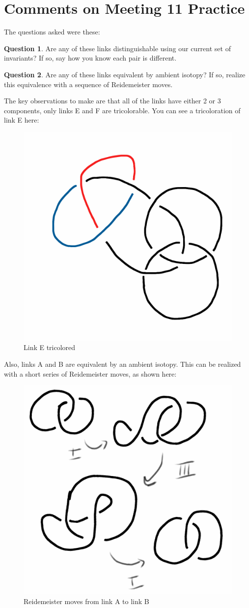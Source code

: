 \documentclass[12pt,letterpaper]{article}
\theoremstyle{definition}
\newtheorem{question}{Question}
\begin{document}
\setlength{\parskip}{1ex plus 0.5ex minus 0.2ex}
\setlength{\parindent}{0pt}

\pagestyle{fancy}
\cfoot{}


\section*{Comments on Meeting 11 Practice}


The questions asked were these:

\begin{question} 
Are any of these links distinguishable using our current set of invariants?
If so, say how you know each pair is different.
\end{question}


\begin{question} 
Are any of these links equivalent by ambient isotopy? 
If so, realize this equivalence with a sequence of Reidemeister moves.
\end{question}

The key observations to make are that all of the links have either 2 or 3 components, only links E and F are tricolorable. You can see a tricoloration of link E here:


\begin{figure}[h]
    \centering
        \includegraphics[width=.3\textwidth]{knotpics/borromean-trefoil-tricolor.png}
        \caption{Link E tricolored}
\end{figure}

Also, links A and B are equivalent by an ambient isotopy. This can be realized with a short series of Reidemeister moves, as shown here:

\begin{figure}[h]
    \centering
        \includegraphics[width=.4\textwidth]{knotpics/hopf-rm-mirror.png}
        \caption{Reidemeister moves from link A to link B}
\end{figure}
\end{document}

